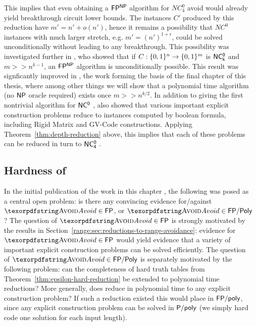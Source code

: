 This implies that even obtaining a $\cl{FP^{NP}}$ algorithm for $NC^0_4$ avoid would already yield breakthrough circuit lower bounds. The instances $C'$ produced by this reduction have $m' = n' + o(n')$, hence it remains a possibility that $NC^0$ instances with much larger stretch, e.g. $m' = (n')^{1+\epsilon}$, could be solved unconditionally without leading to any breakthrough. This possibility was investigated further in \cite{guruswami2022range}, who showed that if $C: \{0,1\}^{n} \to \{0,1\}^{m}$ is $\cl{NC^0_k}$ and $m >> n^{k-1}$, an $\cl{FP^{NP}}$ algorithm is unconditionally possible. This result was signficantly improved in \cite{KPI25}, the work forming the basis of the final chapter of this thesis, where among other things we will show that a polynomial time algorithm (no $\cl{NP}$ oracle required) exists once $m >> n^{k/2}$. In addition to giving the first nontrivial algorithm for $\cl{NC^0}$ \avoid, \cite{guruswami2022range} also showed that various important explicit construction problems reduce to \avoid instances computed by boolean formula, including Rigid Matrix and GV-Code constructions. Applying Theorem~\ref{thm:depth-reduction} above, this implies that each of these problems can be reduced in turn to $\cl{NC^0_4}$ \avoid.
\subsection{Hardness of \avoid}

In the initial publication of the work in this chapter \cite{Korten}, the following was posed as a central open problem: is there any convincing evidence for/against $\avoid \in \cl{FP}$, or $\avoid \in \cl{FP/Poly}$? The question of $\avoid \in \cl{FP}$ is strongly motivated by the results in Section~\ref{range:sec:reductions-to-range-avoidance}: evidence for $\avoid \in \cl{FP}$ would yield evidence that a variety of important explicit construction problems can be solved efficiently. The question of $\avoid \in \cl{FP/Poly}$ is separately motivated by the following problem: can the completeness of hard truth tables from Theorem~\ref{thm:epsilon-hard-reduction} be extended to polynomial time reductions? More generally, does \avoid reduce in polynomial time to any explicit construction problem? If such a reduction existed this would place \avoid in $\cl{FP/poly}$, since any explicit construction problem can be solved in $\cl{P/poly}$ (we simply hard code one solution for each input length).

